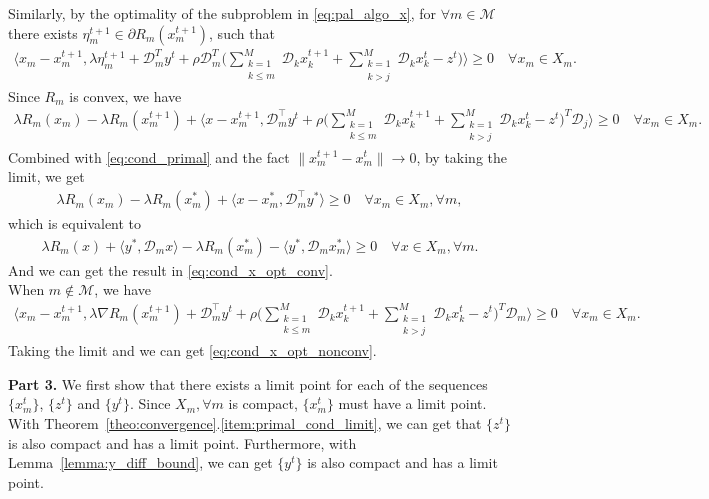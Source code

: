 Similarly, by the optimality of the subproblem in \eqref{eq:pal_algo_x}, for $\forall m\in\mathcal{M}$ there exists $\eta_m^{t+1}\in\partial R_m(x_m^{t+1})$, such that
\begin{align}
    \big\langle x_m-x_m^{t+1}, \lambda \eta_m^{t+1} + \mathcal{D}_m^Ty^t + \rho \mathcal{D}_m^T\big(\sum_{\substack{k=1\\k\le m}}^M \mathcal{D}_kx_k^{t+1} + \sum_{\substack{k=1\\k>j}}^M \mathcal{D}_kx_k^{t} - z^{t}\big)\big\rangle \ge 0\quad \forall x_m\in X_m.
\end{align}
Since $R_m$ is convex, we have
\begin{align}
    \lambda R_m(x_m) - \lambda R_m(x_m^{t+1}) + \big\langle x-x_m^{t+1}, \mathcal{D}_m^\top y^t + \rho\big(\sum_{\substack{k=1\\k\le m}}^M \mathcal{D}_kx_k^{t+1} + \sum_{\substack{k=1\\k>j}}^M \mathcal{D}_kx_k^{t} - z^{t}\big)^T \mathcal{D}_j\big\rangle \ge 0\quad \forall x_m\in X_m.
\end{align}
Combined with \eqref{eq:cond_primal} and the fact $\|x_m^{t+1} - x_m^{t}\|\rightarrow 0$, by taking the limit, we get
\begin{align}
    \lambda R_m(x_m) - \lambda R_m(x_m^*) + \big\langle x-x_m^{*}, \mathcal{D}_m^\top y^* \big\rangle \ge 0\quad \forall x_m\in X_m, \forall m,
\end{align}
which is equivalent to
\begin{align}
    \lambda R_m(x) + \big\langle y^*, \mathcal{D}_mx \big\rangle- \lambda R_m(x_m^*) - \big\langle y^*, \mathcal{D}_mx_m^{*} \big\rangle \ge 0\quad \forall x\in X_m, \forall m.
\end{align}
And we can get the result in \eqref{eq:cond_x_opt_conv}. \\
When $m\not\in\mathcal{M}$, we have
\begin{align}
    \big\langle x_m-x_m^{t+1}, \lambda \nabla R_m(x_m^{t+1}) + \mathcal{D}_m^\top y^t + \rho\big(\sum_{\substack{k=1\\k\le m}}^M \mathcal{D}_kx_k^{t+1} + \sum_{\substack{k=1\\k>j}}^M \mathcal{D}_kx_k^{t} - z^{t}\big)^T \mathcal{D}_m\big\rangle \ge 0\quad \forall x_m\in X_m.
\end{align}
Taking the limit and we can get \eqref{eq:cond_x_opt_nonconv}.

{\bf Part 3.} We first show that there exists a limit point for each of the sequences $\{x_m^t\}$, $\{z^t\}$ and $\{y^t\}$. Since $X_m, \forall m$ is compact, $\{x_m^t\}$ must have a limit point. With Theorem~\ref{theo:convergence}.\ref{item:primal_cond_limit}, we can get that $\{z^t\}$ is also compact and has a limit point. Furthermore, with Lemma~\ref{lemma:y_diff_bound}, we can get $\{y^t\}$ is also compact and has a limit point.

